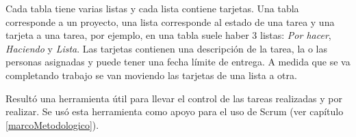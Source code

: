Cada tabla tiene varias listas y cada lista contiene tarjetas. Una tabla corresponde a un proyecto, una lista corresponde al estado de una tarea y una tarjeta a una tarea, por ejemplo, en una tabla suele haber 3 listas: \emph{Por hacer}, \emph{Haciendo} y \emph{Lista}. Las tarjetas contienen una descripción de la tarea, la o las personas asignadas y puede tener una fecha límite de entrega. A medida que se va completando trabajo se van moviendo las tarjetas de una lista a otra.

Resultó una herramienta útil para llevar el control de las tareas realizadas y por realizar. Se usó esta herramienta como apoyo para el uso de Scrum (ver capítulo \ref{marcoMetodologico}).